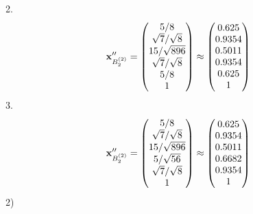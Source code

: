 \documentclass[10pt,a4paper]{article}
\begin{document}
	2.
	\[
		\bold{x}''_{B_2^{(2)}} = 
		\begin{pmatrix}
			{{5}} / {{8}} \\
			{\sqrt{7}} / {\sqrt{8}} \\
			{{15}} / {\sqrt{896}} \\
			{\sqrt{7}} / {\sqrt{8}} \\
			{{5}} / {{8}} \\
			{1}{} \\
		\end{pmatrix}
		\approx
		\begin{pmatrix}
			0.625    \\
			0.9354   \\
			0.5011   \\
			0.9354   \\
			0.625    \\
			1        \\
		\end{pmatrix}
	\]
	3.
	\[
		\bold{x}''_{B_2^{(2)}} = 
		\begin{pmatrix}
			{{5}} / {{8}} \\
			{\sqrt{7}} / {\sqrt{8}} \\
			{{15}} / {\sqrt{896}} \\
			{{5}} / {\sqrt{56}} \\
			{\sqrt{7}} / {\sqrt{8}} \\
			{1}{} \\
		\end{pmatrix}
		\approx
		\begin{pmatrix}
			0.625    \\
			0.9354   \\
			0.5011   \\
			0.6682   \\
			0.9354   \\
			1        \\
		\end{pmatrix}
	\]
	2)
\end{document}
